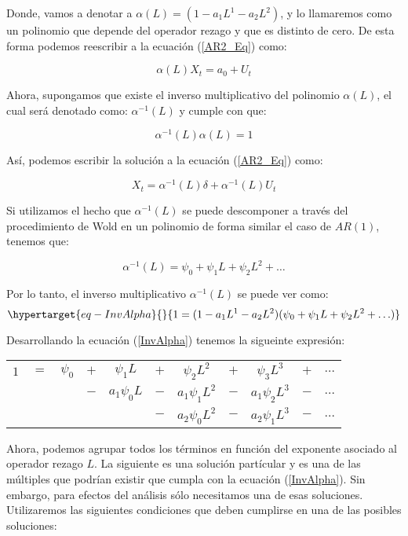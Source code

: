 \documentclass[
  a4paper,
]{article}
\begin{document}
Donde, vamos a denotar a \(\alpha (L) = (1 - a_1 L^1 - a_2 L^2)\), y lo
llamaremos como un polinomio que depende del operador rezago y que es
distinto de cero. De esta forma podemos reescribir a la ecuación
(\ref{AR2_Eq}) como:

\[
\alpha(L) X_t = a_0 + U_t
\]

Ahora, supongamos que existe el inverso multiplicativo del polinomio
\(\alpha(L)\), el cual será denotado como: \(\alpha^{-1}(L)\) y cumple
con que:

\[
\alpha^{-1}(L) \alpha(L) = 1    
\]

Así, podemos escribir la solución a la ecuación (\ref{AR2_Eq}) como:

\[
    X_t = \alpha^{-1}(L) \delta + \alpha^{-1}(L) U_t
\]

Si utilizamos el hecho que \(\alpha^{-1}(L)\) se puede descomponer a
través del procedimiento de Wold en un polinomio de forma similar el
caso de \(AR(1)\), tenemos que:

\[
\alpha^{-1}(L) = \psi_0 + \psi_1 L + \psi_2 L^2 + \ldots
\]

Por lo tanto, el inverso multiplicativo \(\alpha^{-1}(L)\) se puede ver
como: \begin{equation}\protect\hypertarget{eq-InvAlpha}{}{
1 = (1 - a_1 L^1 - a_2 L^2) (\psi_0 + \psi_1 L + \psi_2 L^2 + \ldots)
}\label{eq-InvAlpha}\end{equation}

Desarrollando la ecuación (\ref{InvAlpha}) tenemos la sigueinte
expresión:

\begin{center}
\begin{tabular}{ c c c c c c c c c c c } 
    $1$ & $=$ & $\psi_0$ & $+$ & $\psi_1 L$ & $+$ & $\psi_2 L^2$ & $+$ & $\psi_3 L^3$ & $+$ & $\ldots$ \\
    $ $ & $ $ & $ $ & $-$ & $a_1 \psi_0 L$ & $-$ & $a_1 \psi_1 L^2$ & $-$ & $a_1 \psi_2 L^3$ & $-$ & $\ldots$ \\
    $ $ & $ $ & $ $ & $ $ & $ $ & $-$ & $a_2 \psi_0 L^2 $ & $-$ & $a_2 \psi_1 L^3$ & $-$ & $\ldots$
\end{tabular}
\end{center}

Ahora, podemos agrupar todos los términos en función del exponente
asociado al operador rezago \(L\). La siguiente es una solución
partícular y es una de las múltiples que podrían existir que cumpla con
la ecuación (\ref{InvAlpha}). Sin embargo, para efectos del análisis
sólo necesitamos una de esas soluciones. Utilizaremos las siguientes
condiciones que deben cumplirse en una de las posibles soluciones:
\end{document}
